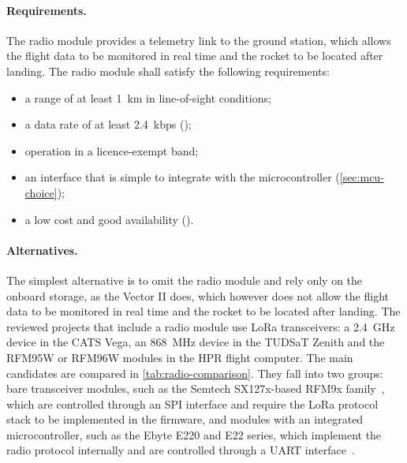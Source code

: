 \paragraph{Requirements.} The radio module provides a telemetry link to the ground station, which allows the flight data to be monitored in real time and the rocket to be located after landing. The radio module shall satisfy the following requirements:
\begin{itemize}
    \item a range of at least \SI{1}{km} in line-of-sight conditions;
    \item a data rate of at least \SI{2.4}{kbps} ();
    \item operation in a licence-exempt band;
    \item an interface that is simple to integrate with the microcontroller (\cref{sec:mcu-choice});
    \item a low cost and good availability ().
\end{itemize}

\paragraph{Alternatives.} The simplest alternative is to omit the radio module and rely only on the onboard storage, as the Vector II does, which however does not allow the flight data to be monitored in real time and the rocket to be located after landing. The reviewed projects that include a radio module use LoRa transceivers: a \SI{2.4}{GHz} device in the CATS Vega, an \SI{868}{MHz} device in the TUDSaT Zenith and the RFM95W or RFM96W modules in the HPR flight computer. The main candidates are compared in \cref{tab:radio-comparison}. They fall into two groups: bare transceiver modules, such as the Semtech SX127x-based RFM9x family~\cite{sx1276}, which are controlled through an SPI interface and require the LoRa protocol stack to be implemented in the firmware, and modules with an integrated microcontroller, such as the Ebyte E220 and E22 series, which implement the radio protocol internally and are controlled through a UART interface~\cite{e220:manual}.

